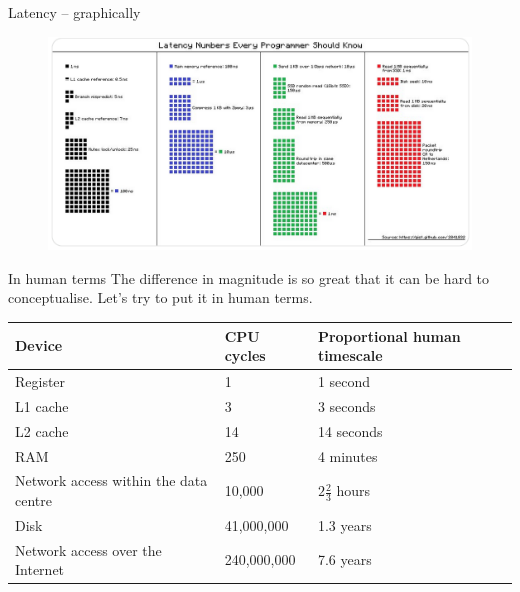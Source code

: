 \documentclass{beamer}
\begin{document}
\begin{frame}{Latency -- graphically}
	\begin{figure}
		\includegraphics[scale=0.60]{Latency_graphically.png}
	\end{figure}
\end{frame}

\begin{frame}{In human terms}
	The difference in magnitude is so great that it can be hard to conceptualise.
	Let's try to put it in human terms.

	\begin{tabular}{lll}
		Device & CPU cycles & Proportional human timescale \\
		\hline
		Register & 1 & 1 second \\
		L1 cache & 3 & 3 seconds \\
		L2 cache & 14 & 14 seconds \\
		RAM & 250 & 4 minutes \\
		Network access within the data centre & 10,000 & $2 \frac{2}{3}$ hours \\
		Disk & 41,000,000 & 1.3 years \\
		Network access over the Internet & 240,000,000 & 7.6 years \\
		\hline
	\end{tabular}
\end{frame}
\end{document}

